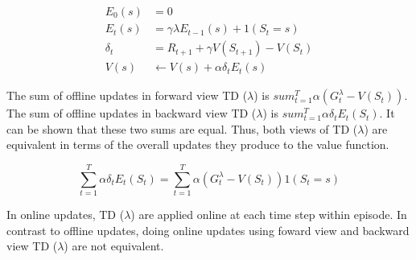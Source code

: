 \begin{align*}
    E_0(s)   & = 0                                      \\
    E_t(s)   & = \gamma \lambda E_{t-1}(s) + 1(S_t = s) \\
    \delta_t & = R_{t+1} + \gamma V(S_{t+1}) - V(S_t)   \\
    V(s)     & \leftarrow V(s) + \alpha \delta_t E_t(s)
\end{align*}

\noindent The sum of offline updates in forward view TD ($\lambda$) is $sum_{t=1}^{T}
    \alpha (G_t^\lambda - V(S_t))$. The sum of offline updates in backward view TD
($\lambda$) is $sum_{t=1}^{T} \alpha \delta_t E_t(S_t)$. It can be shown that
these two sums are equal. Thus, both views of TD ($\lambda$) are equivalent in
terms of the overall updates they produce to the value function.

\[
    \sum_{t=1}^{T} \alpha \delta_t E_t(S_t) = \sum_{t=1}^{T} \alpha (G_t^\lambda - V(S_t)) 1 (S_t = s)
\]

\noindent In online updates, TD ($\lambda$) are applied online at each time step within
episode. In contrast to offline updates, doing online updates using foward view
and backward view TD ($\lambda$) are not equivalent.